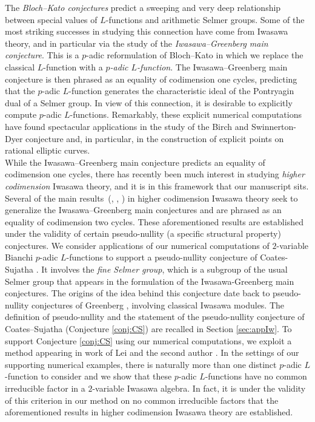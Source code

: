 \documentclass[a4paper,11pt]{article}
\numberwithin{equation}{section}
\begin{document}
The \emph{Bloch--Kato conjectures} predict a sweeping and very deep relationship between special values of $L$-functions and arithmetic Selmer groups. Some of the most striking successes in studying this connection have come from Iwasawa theory, and in particular via the study of the \textit{Iwasawa--Greenberg main conjecture}. This is a $p$-adic reformulation of Bloch--Kato in which we replace the classical $L$-function with a \emph{$p$-adic $L$-function}. The Iwasawa--Greenberg main conjecture is then phrased as an equality of codimension one cycles, predicting that the $p$-adic $L$-function generates the characteristic ideal of the Pontryagin dual of a Selmer group. In view of this connection, it is desirable to explicitly compute $p$-adic $L$-functions.  Remarkably, these explicit numerical computations have found spectacular applications in the study of the Birch and Swinnerton-Dyer conjecture and, in particular, in the construction of explicit points on rational elliptic curves.\\

While the Iwasawa--Greenberg main conjecture predicts an equality of codimension one cycles, there has recently been much interest in studying \textit{higher codimension} Iwasawa theory, and it is in this framework that our manuscript sits. Several of the main  results~(\cite[Theorem 5.2.5]{bleher2015higher}, \cite[Theorem 1]{lei2018codimension}, \cite[Theorem 1]{lei2019codimension}) in higher codimension Iwasawa theory seek to generalize the Iwasawa--Greenberg main conjectures and are phrased as an equality of codimension two cycles. These aforementioned results are established under the validity of certain pseudo-nullity (a specific structural property) conjectures. We consider applications of our numerical computations of $2$-variable Bianchi $p$-adic $L$-functions to support a pseudo-nullity conjecture of Coates-Sujatha \cite[Conjecture B]{MR2148798}.  It involves the \textit{fine Selmer group}, which is a subgroup of the usual Selmer group that appears in the formulation of the Iwasawa-Greenberg main conjectures. The origins of the idea behind this conjecture date back to pseudo-nullity conjectures of Greenberg \cite{Gre76}, \cite[Conjecture 3.5]{MR1846466} involving classical Iwasawa modules. The definition of pseudo-nullity and the statement of the pseudo-nullity conjecture of Coates--Sujatha (Conjecture \ref{conj:CS}) are recalled in Section \ref{sec:appIw}. To support Conjecture \ref{conj:CS} using our numerical computations, we exploit a method appearing in work of Lei and the second author \cite{lei2018codimension}. In the settings of our supporting numerical examples, there is naturally more than one distinct $p$-adic $L$-function to consider and we show that these $p$-adic $L$-functions have no common irreducible factor in a $2$-variable Iwasawa algebra. In fact, it is under the validity of this criterion in our method  on no common irreducible factors that the aforementioned results in higher codimension Iwasawa theory are established. \\
\end{document}
